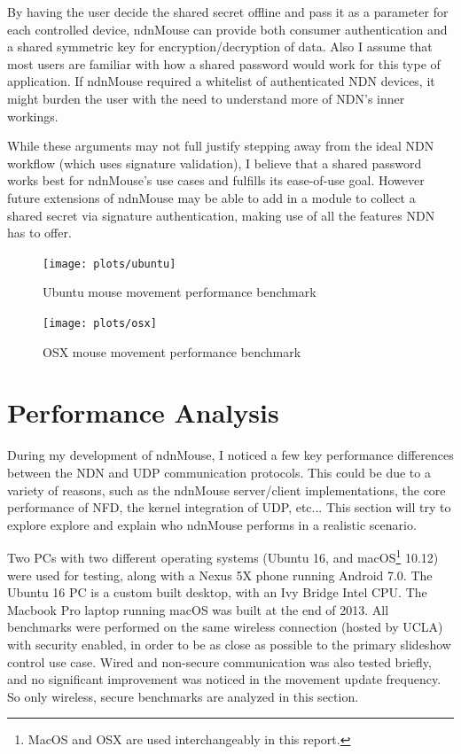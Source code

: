 \documentclass{sig-alternate}
\renewcommand\_{\textunderscore\allowbreak}  %
\begin{document}
By having the user decide the shared secret offline and pass it as a parameter for each controlled device, ndnMouse can provide both consumer authentication and a shared symmetric key for encryption/decryption of data. Also I assume that most users are familiar with how a shared password would work for this type of application. If ndnMouse required a whitelist of authenticated NDN devices, it might burden the user with the need to understand more of NDN's inner workings. 

While these arguments may not full justify stepping away from the ideal NDN workflow (which uses signature validation), I believe that a shared password works best for ndnMouse's use cases and fulfills its ease-of-use goal. However future extensions of ndnMouse may be able to add in a module to collect a shared secret via signature authentication, making use of all the features NDN has to offer.

\begin{figure}
	\centering
	\hypertarget{fig:ubuntuBenchmark}{}
	\texttt{[image: plots/ubuntu]}
	\caption{Ubuntu mouse movement performance benchmark}
\end{figure}

\begin{figure}
	\centering
	\hypertarget{fig:osxBenchmark}{}
	\texttt{[image: plots/osx]}
	\caption{OSX mouse movement performance benchmark}
\end{figure}

\section{Performance Analysis}
During my development of ndnMouse, I noticed a few key performance differences between the NDN and UDP communication protocols. This could be due to a variety of reasons, such as the ndnMouse server/client implementations, the core performance of NFD, the kernel integration of UDP, etc... This section will try to explore explore and explain who ndnMouse performs in a realistic scenario.

Two PCs with two different operating systems (Ubuntu 16, and macOS\footnote{MacOS and OSX are used interchangeably in this report.} 10.12) were used for testing, along with a Nexus 5X phone running Android 7.0. The Ubuntu 16 PC is a custom built desktop, with an Ivy Bridge Intel CPU. The Macbook Pro laptop running macOS was built at the end of 2013. All benchmarks were performed on the same wireless connection (hosted by UCLA) with security enabled, in order to be as close as possible to the primary slideshow control use case. Wired and non-secure communication was also tested briefly, and no significant improvement was noticed in the movement update frequency. So only wireless, secure benchmarks are analyzed in this section.
\end{document}

